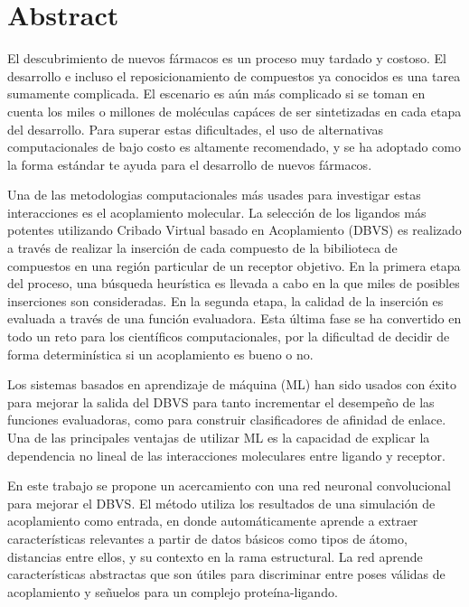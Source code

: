 \section{Abstract}
El descubrimiento de nuevos fármacos es un proceso muy tardado y costoso.
El desarrollo e incluso el reposicionamiento de compuestos ya conocidos es una
tarea sumamente complicada. El escenario es aún más complicado si se toman en cuenta
los miles o millones de moléculas capáces de ser sintetizadas en cada etapa del desarrollo.
Para superar estas dificultades, el uso de alternativas computacionales de bajo costo
es altamente recomendado, y se ha adoptado como la forma estándar te ayuda para el
desarrollo de nuevos fármacos.

Una de las metodologias computacionales más usades para investigar estas interacciones es
el acoplamiento molecular. La selección de los ligandos más potentes utilizando Cribado
Virtual basado en Acoplamiento (DBVS) es realizado a través de realizar la inserción de
cada compuesto de la bibilioteca de compuestos en una región particular de un receptor
objetivo. En la primera etapa del proceso, una búsqueda heurística es llevada a cabo
en la que miles de posibles inserciones son consideradas. En la segunda etapa, la calidad
de la inserción es evaluada a través de una función evaluadora. Esta última fase se ha
convertido en todo un reto para los científicos computacionales, por la dificultad de decidir
de forma determinística si un acoplamiento es bueno o no.

Los sistemas basados en aprendizaje de máquina (ML) han sido usados con éxito para mejorar la
salida del DBVS para tanto incrementar el desempeño de las funciones evaluadoras, como para
construir clasificadores de afinidad de enlace. Una de las principales ventajas de utilizar ML
es la capacidad de explicar la dependencia no lineal de las interacciones moleculares entre
ligando y receptor.

En este trabajo se propone un acercamiento con una red neuronal convolucional para mejorar el
DBVS. El método utiliza los resultados de una simulación de acoplamiento como entrada, en
donde automáticamente aprende a extraer características relevantes a partir de datos básicos
como tipos de átomo, distancias entre ellos, y su contexto en la rama estructural. La red
aprende características abstractas que son útiles para discriminar entre poses válidas de
acoplamiento y señuelos para un complejo proteína-ligando.
